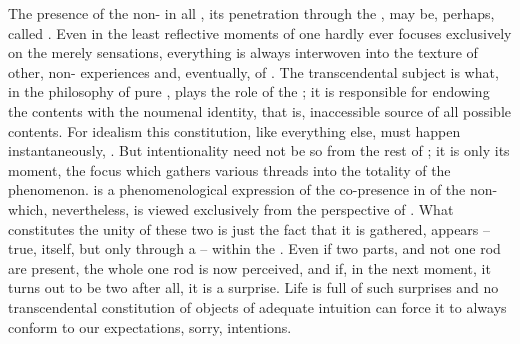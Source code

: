 The presence of the non- in all ,
its penetration through the , may be, perhaps, called
.  Even in the least reflective moments of  one
hardly ever focuses exclusively on the merely  sensations,
everything is always interwoven into the texture of other, non-
experiences and, eventually, of .  The transcendental subject
is what, in the philosophy of pure , plays the role of the
; it is responsible for endowing the  contents with
the noumenal identity, that is, inaccessible source of all possible contents.
For idealism this constitution, like everything else, must happen
instantaneously, .  But intentionality need not be so 
from the rest of ; it is only its  moment, the focus
which gathers various threads into the totality of the  phenomenon.
 is a phenomenological expression of the co-presence in
 of the non- which, nevertheless, is viewed
exclusively from the perspective of .  What constitutes the unity
of these two  is just the fact that it is gathered, appears -- true,
itself, but only through a  -- within the \hoa.  Even if two parts, and
not one rod are present, the whole one rod is now perceived, and if, in the next
moment, it turns out to be two after all, it is a surprise.  Life is full of
such surprises and no transcendental constitution of objects of adequate
intuition can force it to always conform to our expectations, sorry, intentions.

